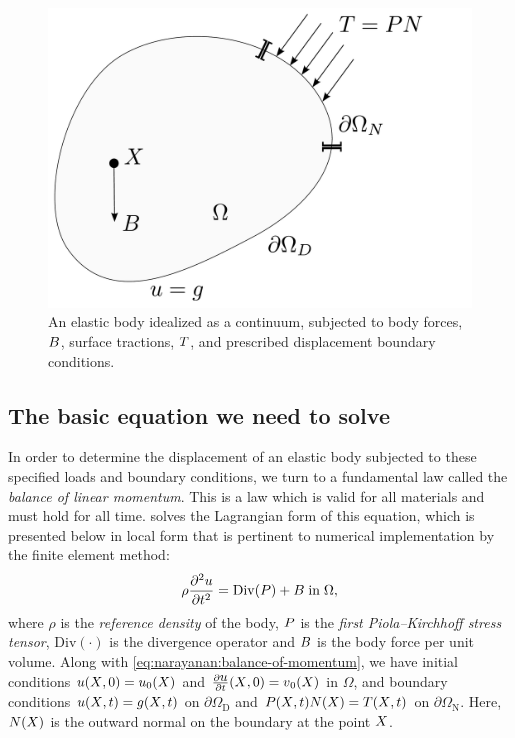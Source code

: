 \begin{figure}
  \centering
  \includegraphics[width=\largefig]{chapters/narayanan/images/pdf/continuumpotato}
  \caption{An elastic body idealized as a continuum, subjected to body
    forces, $\mbox{$ B$}$, surface tractions, $\mbox{$ T$}$, and prescribed
    displacement boundary conditions.}
    \label{fig:narayanan:continuumpotato}
\end{figure}

\subsection{The basic equation we need to solve}

In order to determine the displacement of an elastic body subjected to
these specified loads and boundary conditions, we turn to a
fundamental law called the {\em balance of linear momentum}. This is a
law which is valid for all materials and must hold for all
time. \twist{} solves the Lagrangian form of this equation, which is
presented below in local form that is pertinent to numerical
implementation by the finite element method:
\begin{equation}
  \rho \frac{\partial^{2} \mbox{$ u$}}{\partial t^{2}} = \mathrm{Div}(\mbox{$ P$})
  + \mbox{$ B$}\; \mathrm{in}\; \Omega,
  \label{eq:narayanan:balance-of-momentum}
\end{equation}
where $\rho$ is the {\em reference density} of the body, $\mbox{$ P$}$ is the
{\em first Piola--Kirchhoff stress tensor}, $\mathrm{Div} (\cdot)$ is
the divergence operator and $\mbox{$ B$}$ is the body force per unit
volume. Along with \eqref{eq:narayanan:balance-of-momentum}, we have
initial conditions $\mbox{$ u$}(\mbox{$ X$}, 0) = \mbox{$ u$}_{0}(\mbox{$ X$})$ and
$\frac{\partial\mbox{$ u$}}{\partial t}(\mbox{$ X$}, 0) = \mbox{$ v$}_{0}(\mbox{$ X$})$ in $\Omega$,
and boundary conditions $\mbox{$ u$}(\mbox{$ X$}, t) = \mbox{$ g$}(\mbox{$ X$}, t)$ on
$\partial\Omega_{\mathrm{D}}$ and $\mbox{$ P$}(\mbox{$ X$}, t) \mbox{$ N$}(\mbox{$ X$}) = \mbox{$ T$}(\mbox{$ X$}, t)$
on $\partial\Omega_{\mathrm{N}}$. Here, $\mbox{$ N$}(X)$ is the outward normal
on the boundary at the point $\mbox{$ X$}$.

